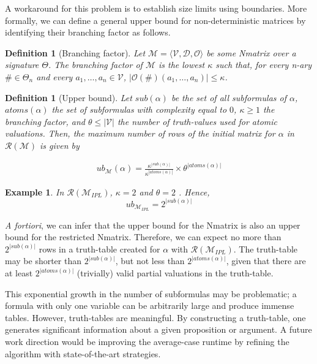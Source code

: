 \documentclass[12pt]{article}
\newtheorem{definition}[theorem]{Definition}
\newtheorem{example}[theorem]{Example}
\begin{document}
A workaround for this problem is to establish size limits using boundaries. More formally, we can define a general upper bound for non-deterministic matrices by identifying their branching factor as follows.

\begin{definition}[Branching factor]
 Let $\mathcal{M} = \langle \mathcal{V}, \mathcal{D}, \mathcal{O} \rangle$ be some Nmatrix over a signature $\Theta$. The branching factor of $\mathcal{M}$ is the lowest $\kappa$ such that, for every n-ary $\# \in \Theta_n$ and every $a_1, \ldots, a_n \in \mathcal{V}$, $| \mathcal{O}(\#) (a_1, \ldots, a_n) | \leq \kappa$.
  \end{definition}

\begin{definition}[Upper bound]\label{def:ub}
 Let $sub(\alpha)$ be the set of all subformulas of $\alpha$, $atoms(\alpha)$ the set of subformulas with complexity equal to $0$, $\kappa \geq 1$ the branching factor, and $\theta \leq | \mathcal{V} |$ the number of truth-values used for atomic valuations. Then, the maximum number of rows of the initial matrix for $\alpha$ in $\mathcal{R}(\mathcal{M})$ is given by

    \begin{align*}
 ub_{\mathcal{M}} (\alpha) = \frac{\kappa^{|sub(\alpha)|}}{\kappa^{|atoms(\alpha)|}} \times \theta^{|atoms(\alpha)|}
      \end{align*}
\end{definition}


\begin{example}
In $\mathcal{R}(\mathcal{M}_{IPL})$, $\kappa = 2$ and $\theta = 2$ . Hence,
\[
 ub_{\mathcal{M}_{IPL}} = 2^{|sub(\alpha)|}
\]
\end{example}

\emph{A fortiori}, we can infer that the upper bound for the Nmatrix is also an upper bound for the restricted Nmatrix. Therefore, we can expect no more than $2^{|sub(\alpha)|}$ rows in a truth-table created for $\alpha$ with $\mathcal{R}(\mathcal{M}_{IPL})$. The truth-table may be shorter than $2^{|sub(\alpha)|}$, but not less than $2^{|atoms(\alpha)|}$, given that there are at least $2^{|atoms(\alpha)|}$ (trivially) valid partial valuations in the truth-table.


This exponential growth in the number of subformulas may be problematic; a formula with only one variable can be arbitrarily large and produce immense tables. However, truth-tables are meaningful. By constructing a truth-table, one generates significant information about a given proposition or argument. A future work direction would be improving the average-case runtime by refining the algorithm with state-of-the-art strategies.
\end{document}
